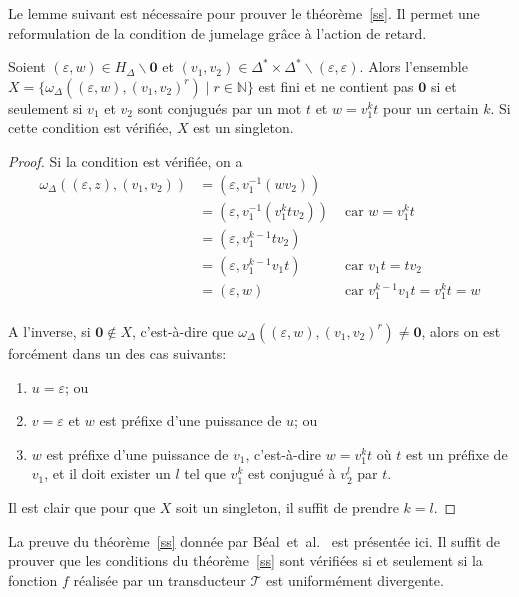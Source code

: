     Le lemme suivant est nécessaire pour prouver le théorème~\ref{ss}. Il permet une reformulation de la condition de jumelage grâce à l'action de retard. \\
    
    \begin{lemma}
    	\label{lem}
    	Soient $(\varepsilon,w) \in H_\Delta \backslash \mathbf{0}$ et $(v_1,v_2) \in \Delta^* \times \Delta^* \backslash (\varepsilon,\varepsilon)$. Alors l'ensemble $X = \{\omega_\Delta((\varepsilon,w), (v_1,v_2)^r) \mid r \in \mathbb{N} \}$ est fini et ne contient pas $\mathbf{0}$ si et seulement si $v_1$ et $v_2$ sont conjugués par un mot $t$ et $w = v_1^kt$ pour un certain $k$. Si cette condition est vérifiée, $X$ est un singleton.
    \end{lemma}
    \begin{proof}
    	Si la condition est vérifiée, on a
    	\begin{align*}
    	\omega_\Delta((\varepsilon,z),(v_1,v_2)) &= (\varepsilon,v_1^{-1}(wv_2)) \\
										     &= (\varepsilon,v_1^{-1}(v_1^ktv_2)) &\text{ car } w = v_1^kt \\
										     &= (\varepsilon,v_1^{k-1}tv_2) \\
										     &= (\varepsilon,v_1^{k-1}v_1t) &\text{ car } v_1t = tv_2 \\
										     &= (\varepsilon,w) &\text{ car } v_1^{k-1}v_1t = v_1^kt = w \\
    	\end{align*}
    	
    	A l'inverse, si $\mathbf{0} \not\in X$, c'est-à-dire que $\omega_\Delta((\varepsilon,w),(v_1,v_2)^r) \neq \mathbf{0}$, alors on est forcément dans un des cas suivants:
    	\begin{enumerate}
    		\item $u = \varepsilon$; ou
    		\item $v = \varepsilon$ et $w$ est préfixe d'une puissance de $u$; ou
    		\item $w$ est préfixe d'une puissance de $v_1$, c'est-à-dire $w = v_1^kt$ où $t$ est un préfixe de $v_1$, et il doit exister un $l$ tel que $v_1^k$ est conjugué à $v_2^l$ par $t$.
    	\end{enumerate}
    	Il est clair que pour que $X$ soit un singleton, il suffit de prendre $k=l$.
    \end{proof}
    
    La preuve du théorème~\ref{ss} donnée par Béal~et~al.~\cite{Bea03} est présentée ici. Il suffit de prouver que les conditions du théorème~\ref{ss} sont vérifiées si et seulement si la fonction $f$ réalisée par un transducteur $\mathscr{T}$ est uniformément divergente.
    

